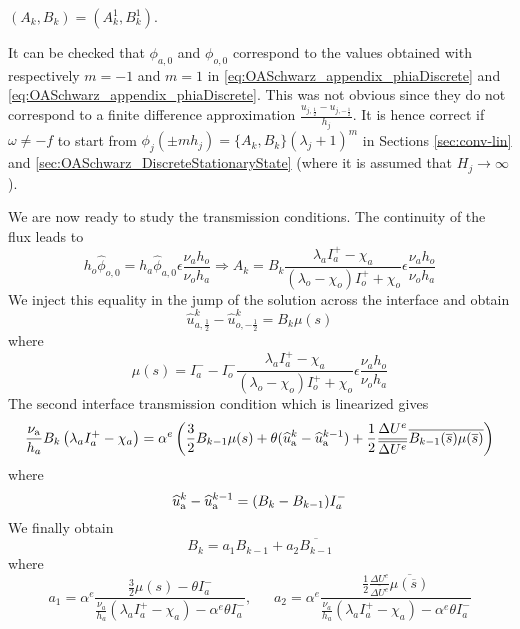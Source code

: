 $(A_k, B_k) = (A_k^1, B_k^1)$.
\begin{remark}
It can be checked that $\phi_{a,0}$ and $\phi_{o,0}$
correspond to the values obtained with respectively
$m=-1$ and $m=1$ in
\eqref{eq:OASchwarz_appendix_phiaDiscrete} and
\eqref{eq:OASchwarz_appendix_phiaDiscrete}. This
was not obvious since they do not correspond to a finite
difference approximation $\frac{u_{j, \frac{1}{2}} -
u_{j, -\frac{1}{2}}}{h_j}$.
It is hence correct if $\omega \neq -f$ to start from
	$\phi_j(\pm m h_j)= \{A_k, B_k\}(\lambda_j+1)^m$ in Sections
	\ref{sec:conv-lin} and \ref{sec:OASchwarz_DiscreteStationaryState} (where it is assumed that $H_j \rightarrow \infty$).
\end{remark}
We are now ready to study the transmission conditions.
The continuity of the flux leads to
\begin{equation}
    h_o \widehat{\phi}_{o,0} = h_a \widehat{\phi}_{a,0}
    \epsilon\frac{\nu_a h_o}
    {\nu_o h_a}
    \Rightarrow
	A_k = B_k \frac{\lambda_a I_a^{+} - \chi_a}
	{(\lambda_o - \chi_o)I_o^{+} + \chi_o}
    \epsilon\frac{\nu_a h_o}
    {\nu_o h_a}
\end{equation}
We inject this equality in the jump of the solution across
the interface and obtain
\begin{equation}
    \widehat{u}_{a,\frac{1}{2}}^k - \widehat{u}_{o,-\frac{1}{2}}^k
    = B_k \mu(s)
\end{equation}
where
\begin{equation}
	\mu(s) = I_a^{-} - I_o^{-}
\frac{\lambda_a I_a^{+} - \chi_a}
	{(\lambda_o - \chi_o)I_o^{+} + \chi_o}
    \epsilon\frac{\nu_a h_o}
    {\nu_o h_a}
\end{equation}
The second interface transmission condition which
is linearized gives
\begin{equation}
\frac{\nu_{\rm a}}{h_a}B_k \left(\lambda_a I_a^{+} - \chi_a \right)
	=  \alpha^e \left(\frac{3}{2}B_{k-1} \mu(s)
+\theta ( \widehat{u}_{\rm a}^{k} -  \widehat{u}_{\rm a}^{k-1})
+ \frac{1}{2}\frac{\Delta U^e}{\overline{\Delta U^e}}
\overline{B_{k-1}(\overline{s}) \mu(\overline{s})}
\right)
\end{equation}
where
\begin{equation}
	\widehat{u}_{\rm a}^{k} -  \widehat{u}_{\rm a}^{k-1} = (B_k - B_{k-1})I_a^{-}
\end{equation}
We finally obtain
\begin{equation}
    B_k = a_1 B_{k-1} + a_2 \overline{B_{k-1}}
\end{equation}
where
\begin{equation}
    a_1 = \alpha^e\frac{\frac{3}{2}\mu(s) - \theta I_a^{-}}
	{\frac{\nu_a}{h_a}\left(\lambda_a I_a^{+} - \chi_a \right)
	- \alpha^e \theta I_a^{-}}, ~~~~~~~
        a_2 = \alpha^e\frac{\frac{1}{2}\frac{\Delta U^e}{\overline{\Delta U^e}}
 \overline{\mu(\overline{s})}}
	{\frac{\nu_a}{h_a}\left(\lambda_a I_a^{+} - \chi_a \right)
	- \alpha^e \theta I_a^{-}}
\end{equation}
